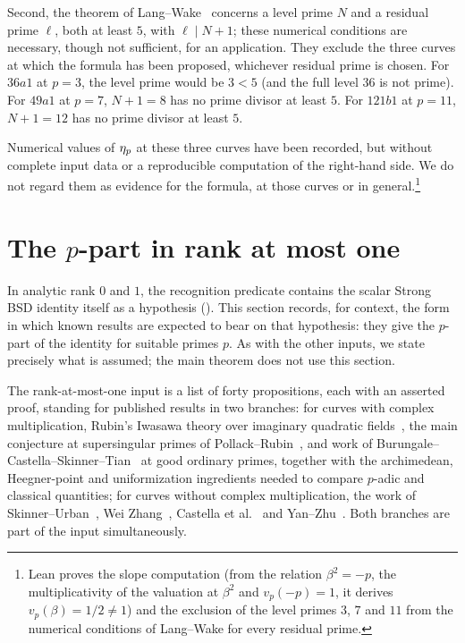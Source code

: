 \documentclass[11pt]{article}
\theoremstyle{definition}
\begin{document}
Second, the theorem of Lang--Wake~\citep[Theorem~1.1]{LangWake2025}
concerns a level prime $N$ and a residual prime $\ell$, both at least $5$,
with $\ell\mid N+1$; these numerical conditions are necessary, though not
sufficient, for an application.  They exclude the three curves at which
the formula has been proposed, whichever residual prime is chosen.  For
$36a1$ at $p=3$, the level prime would be $3<5$ (and the full level $36$
is not prime).  For $49a1$ at $p=7$, $N+1=8$ has no prime divisor at least
$5$.  For $121b1$ at $p=11$, $N+1=12$ has no prime divisor at least $5$.

Numerical values of $\eta_p$ at these three curves have been recorded,
but without complete input data or a reproducible computation of the
right-hand side.  We do not regard them as evidence for the formula, at
those curves or in general.\footnote{Lean proves the slope computation (from the relation
$\beta^2=-p$, the multiplicativity of the valuation at $\beta^2$ and
$v_p(-p)=1$, it derives $v_p(\beta)=1/2\neq1$) and the exclusion of the
level primes $3$, $7$ and $11$ from the numerical conditions of
Lang--Wake for every residual prime.}
 \section{The \texorpdfstring{$p$}{p}-part in rank at most one}
\label{sec:t-cascade}

In analytic rank $0$ and $1$, the recognition predicate contains the
scalar Strong BSD identity itself as a hypothesis
().  This section records, for context, the
form in which known results are expected to bear on that hypothesis: they
give the $p$-part of the identity for suitable primes $p$.  As with the
other inputs, we state precisely what is assumed; the main theorem does not
use this section.

\begin{definition}\label{def:closure:t-cascade-import}
The rank-at-most-one input is a list of forty propositions, each with an
asserted proof, standing for published results in two branches: for curves
with complex multiplication, Rubin's Iwasawa theory over imaginary
quadratic fields~\citep{Rubin1991}, the main conjecture at supersingular
primes of Pollack--Rubin~\citep[Theorem~7.3]{PollackRubin2004}, and work of
Burungale--Castella--Skinner--Tian~\citep{BurungaleCastellaSkinnerTian2022}
at good ordinary primes, together with the archimedean, Heegner-point and
uniformization ingredients needed to compare $p$-adic and classical
quantities; for curves without complex multiplication, the work of
Skinner--Urban~\citep{SkinnerUrban2014}, Wei Zhang~\citep{WeiZhang2014},
Castella et al.~\citep{CHKLL2025} and Yan--Zhu~\citep{YanZhu2026}.  Both
branches are part of the input simultaneously.
\end{definition}
\end{document}

